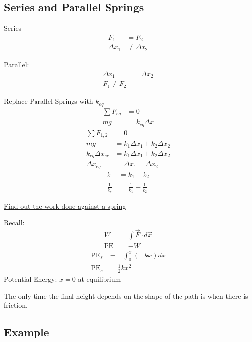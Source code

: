 \documentclass{article}
\begin{document}
\subsection{Series and Parallel Springs}

Series
\begin{align*}
	F_1 & = F_2 \\
	\Delta x_1 & \neq \Delta x_2
\end{align*}

Parallel:
\begin{align*}
	\Delta x_1 & = \Delta x_2 \\
	F_1 \neq F_2
\end{align*}

Replace Parallel Springs with $ k_{eq} $
\begin{align*}
	\sum F_{eq} & = 0 \\
	mg & = k_{eq} \Delta x
\end{align*}
\begin{align*}
	\sum F_{1, 2} & = 0 \\
	mg & = k_1 \Delta x_1 + k_2 \Delta x_2 \\
	k_{eq} \Delta x_{eq} & = k_1 \Delta x_1 + k_2 \Delta x_2 \\
	\Delta x_{eq} & = \Delta x_1 = \Delta x_2
\end{align*}
\begin{align*}
	k_{\parallel} & = k_1 + k_2 \\
	\frac{1}{k_s} & = \frac{1}{k_1} + \frac{1}{k_2}
\end{align*}

\hr

\underline{Find out the work done against a spring}

Recall:
\begin{align*}
	W & = \int \vec{F} \cdot d\vec{x} \\
	\text{PE} & = -W
\end{align*}
\begin{align*}
	\text{PE}_s & = - \int_0^x (-kx) dx \\
	\text{PE}_s & = \frac{1}{2}kx^2
\end{align*}
Potential Energy: 
$ x = 0 $ at equilibrium

The only time the final height depends on the shape of the path is when there is friction.

\subsection{Example}
\end{document}
